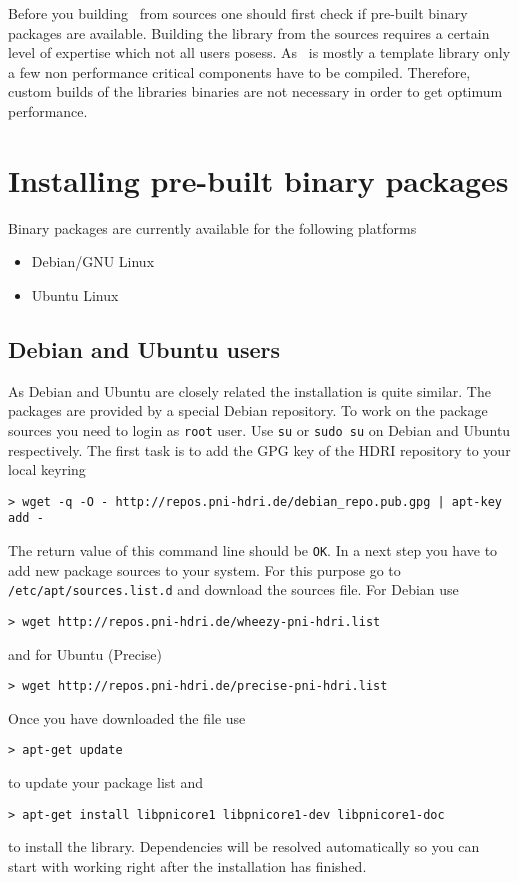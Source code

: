 
Before you building \libpnicore\ from sources one should first check if
pre-built binary packages are available. Building the library from the sources
requires a certain level of expertise which not all users posess. 
As
\libpnicore\ is mostly a template library only a few non performance critical
components have to be compiled. Therefore, custom builds of the libraries
binaries are not necessary in order to get optimum performance.

\section{Installing pre-built binary packages}

Binary packages are currently available for the following platforms 
\begin{itemize}
\item Debian/GNU Linux 
\item Ubuntu Linux 
\end{itemize}

\subsection{Debian and Ubuntu users}

As Debian and Ubuntu are closely related the installation is quite similar. 
The packages are provided by a special Debian repository. To work on the package
sources you need to login as \texttt{root} user. Use \texttt{su} or \texttt{sudo su} on
Debian and Ubuntu respectively. 
The first task is to add the GPG key of the HDRI repository to your local
keyring
\begin{verbatim}
> wget -q -O - http://repos.pni-hdri.de/debian_repo.pub.gpg | apt-key add -
\end{verbatim}
The return value of this command line should be \texttt{OK}.
In a next step you have to add new package sources to your system. For this
purpose go to \texttt{/etc/apt/sources.list.d} and download the sources file. 
For Debian use
\begin{verbatim}
> wget http://repos.pni-hdri.de/wheezy-pni-hdri.list
\end{verbatim}
and for Ubuntu (Precise) 
\begin{verbatim}
> wget http://repos.pni-hdri.de/precise-pni-hdri.list
\end{verbatim}
Once you have downloaded the file use 
\begin{verbatim}
> apt-get update
\end{verbatim}
to update your package list and 
\begin{verbatim}
> apt-get install libpnicore1 libpnicore1-dev libpnicore1-doc
\end{verbatim}
to install the library. Dependencies will be resolved automatically so you can
start with working right after the installation has finished.



